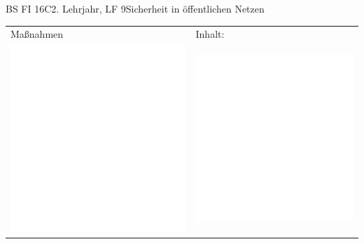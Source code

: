 \documentclass[oneside,openany,headings=optiontotoc,11pt,numbers=noenddot]{scrreprt}
\begin{document}
\begin{worksheet}{BS FI 16C}{2. Lehrjahr, LF 9}{Sicherheit in öffentlichen Netzen}
\begin{framed}
\begin{tabularx}{\textwidth}{|X|X|}
				\hline
				\hline
				\color{codegray}Maßnahmen & \color{codegray}Inhalt:\\
				\includegraphics[scale=0.5]{../empty.jpg} & \includegraphics[scale=0.5]{../empty.jpg} \\

\end{tabularx}
\end{framed}
\end{worksheet}
\end{document}
